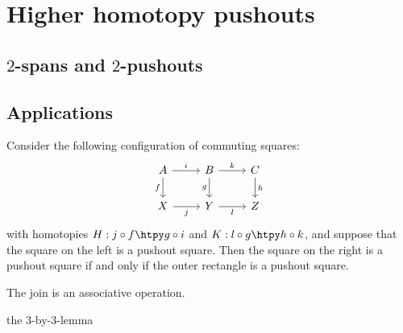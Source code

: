 \documentclass[11pt]{memoir} %
\begin{document}






\chapter{Higher homotopy pushouts}

\section{$2$-spans and $2$-pushouts}

\section{Applications}
\begin{thm}
Consider the following configuration of commuting squares:
\begin{equation*}
\begin{tikzcd}
A \arrow[r,"i"] \arrow[d,swap,"f"] & B \arrow[r,"k"] \arrow[d,swap,"g"] & C \arrow[d,"h"] \\
X \arrow[r,swap,"j"] & Y \arrow[r,swap,"l"] & Z
\end{tikzcd}
\end{equation*}
with homotopies $H:j\circ f\htpy g\circ i$ and $K:l\circ g\htpy h\circ k$, and suppose that the square on the left is a pushout square. 
Then the square on the right is a pushout square if and only if the outer rectangle is a pushout square.
\end{thm}

\begin{thm}
The join is an associative operation.
\end{thm}

\begin{thm}
the 3-by-3-lemma
\end{thm}
\end{document}
